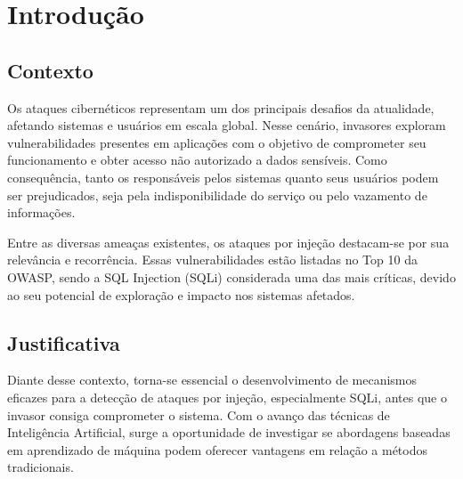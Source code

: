 \documentclass[
    12pt,                %
    openright,           %
    oneside,             %
    a4paper,             %
    english,             %
    brazil               %
]{abntex2}
\begin{document}
\tableofcontents*
\cleardoublepage

\textual

\chapter{Introdução}
\label{cap:introducao}

\section{Contexto}
\label{sec:contexto}

Os ataques cibernéticos representam um dos principais desafios da atualidade, afetando sistemas e usuários em escala global. Nesse cenário, invasores exploram vulnerabilidades presentes em aplicações com o objetivo de comprometer seu funcionamento e obter acesso não autorizado a dados sensíveis. Como consequência, tanto os responsáveis pelos sistemas quanto seus usuários podem ser prejudicados, seja pela indisponibilidade do serviço ou pelo vazamento de informações. 

Entre as diversas ameaças existentes, os ataques por injeção destacam-se por sua relevância e recorrência. Essas vulnerabilidades estão listadas no Top 10 da OWASP, sendo a SQL Injection (SQLi) considerada uma das mais críticas, devido ao seu potencial de exploração e impacto nos sistemas afetados. \cite{OWASP2025} 
\section{Justificativa}
\label{sec:justificativa}

Diante desse contexto, torna-se essencial o desenvolvimento de mecanismos eficazes para a detecção de ataques por injeção, especialmente SQLi, antes que o invasor consiga comprometer o sistema. Com o avanço das técnicas de Inteligência Artificial, surge a oportunidade de investigar se abordagens baseadas em aprendizado de máquina podem oferecer vantagens em relação a métodos tradicionais.
\end{document}
